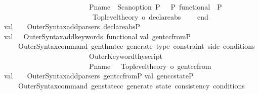 \begin{isabellebody}
\ \ \ \ \ \ \ \ \ \ \ \ \ \ \ \ \ \ \ \ \ \ \ \ {\isacharparenleft}{\isacharparenleft}P{\isachardot}name{\isacharparenright}\ {\isacharminus}{\isacharminus}\ {\isacharparenleft}Scan{\isachardot}option\ {\isacharparenleft}P{\isachardot}{\isachardollar}{\isachardollar}{\isachardollar}\ {\isachardoublequote}{\isacharbrackleft}{\isachardoublequote}\ {\isacharbar}{\isacharminus}{\isacharminus}\ P{\isachardot}{\isachardollar}{\isachardollar}{\isachardollar}\ {\isachardoublequote}functional{\isachardoublequote}\ {\isacharminus}{\isacharminus}{\isacharbar}\ P{\isachardot}{\isachardollar}{\isachardollar}{\isachardollar}\ {\isachardoublequote}{\isacharbrackright}{\isachardoublequote}{\isacharparenright}{\isacharparenright}\isanewline
\ \ \ \ \ \ \ \ \ \ \ \ \ \ \ \ \ \ \ \ \ \ \ \ {\isachargreater}{\isachargreater}\ {\isacharparenleft}Toplevel{\isachardot}theory\ o\ declare{\isacharunderscore}abs{\isacharprime}{\isacharparenright}{\isacharparenright}\isanewline
\ \ \ \ end{\isacharsemicolon}\isanewline
val\ {\isacharunderscore}\ {\isacharequal}\ \ OuterSyntax{\isachardot}add{\isacharunderscore}parsers\ {\isacharbrackleft}declare{\isacharunderscore}absP{\isacharbrackright}{\isacharsemicolon}\isanewline
val\ {\isacharunderscore}\ {\isacharequal}\ OuterSyntax{\isachardot}add{\isacharunderscore}keywords\ {\isacharbrackleft}{\isachardoublequote}functional{\isachardoublequote}{\isacharbrackright}{\isacharsemicolon}\isanewline
\isanewline
val\ gen{\isacharunderscore}tcc{\isacharunderscore}fromP\ {\isacharequal}\isanewline
\ \ \ \ OuterSyntax{\isachardot}command\ {\isachardoublequote}gen{\isacharunderscore}thm{\isacharunderscore}tcc{\isachardoublequote}\ {\isachardoublequote}generate\ type\ constraint\ side\ conditions{\isachardoublequote}\ \isanewline
\ \ \ \ \ \ \ \ \ \ \ \ \ \ \ \ \ \ \ \ \ \ \ \ OuterKeyword{\isachardot}thy{\isacharunderscore}script\isanewline
\ \ \ \ \ \ \ \ \ \ \ \ \ \ \ \ \ \ \ \ \ \ \ \ {\isacharparenleft}{\isacharparenleft}P{\isachardot}name{\isacharparenright}\ \ {\isachargreater}{\isachargreater}\ {\isacharparenleft}Toplevel{\isachardot}theory\ o\ gen{\isacharunderscore}tcc{\isacharunderscore}from{\isacharparenright}{\isacharparenright}{\isacharsemicolon}\isanewline
val\ {\isacharunderscore}\ {\isacharequal}\ \ OuterSyntax{\isachardot}add{\isacharunderscore}parsers\ {\isacharbrackleft}gen{\isacharunderscore}tcc{\isacharunderscore}fromP{\isacharbrackright}{\isacharsemicolon}\isanewline
\isanewline
\isanewline
val\ gen{\isacharunderscore}cc{\isacharunderscore}stateP\ {\isacharequal}\isanewline
\ \ \ \ OuterSyntax{\isachardot}command\ {\isachardoublequote}gen{\isacharunderscore}state{\isacharunderscore}cc{\isachardoublequote}\ {\isachardoublequote}generate\ state\ consistency\ conditions{\isachardoublequote}\ \isanewline

\end{isabellebody}
